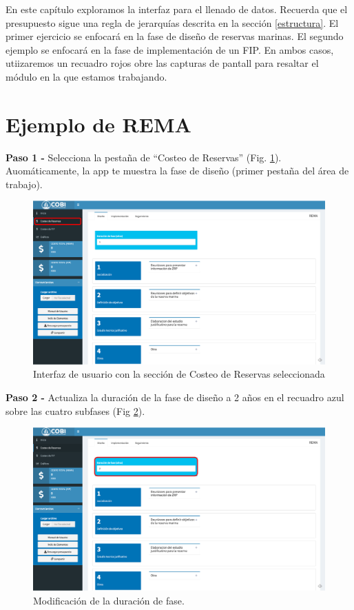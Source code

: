 \documentclass[
]{book}
\begin{document}
En este capítulo exploramos la interfaz para el llenado de datos. Recuerda que el presupuesto sigue una regla de jerarquías descrita en la sección \ref{estructura}. El primer ejercicio se enfocará en la fase de diseño de reservas marinas. El segundo ejemplo se enfocará en la fase de implementación de un FIP. En ambos casos, utiizaremos un recuadro rojos obre las capturas de pantall para resaltar el módulo en la que estamos trabajando.

\hypertarget{rema}{%
\section{Ejemplo de REMA}\label{rema}}

\textbf{Paso 1 - } Selecciona la pestaña de ``Costeo de Reservas'' (Fig. \ref{fig:rem-dis-1}). Auomáticamente, la app te muestra la fase de diseño (primer pestaña del área de trabajo).

\begin{figure}
\includegraphics[width=61.11in]{images/rema_dis_1} \caption{Interfaz de usuario con la sección de Costeo de Reservas seleccionada}\label{fig:rem-dis-1}
\end{figure}

\textbf{Paso 2 - } Actualiza la duración de la fase de diseño a 2 años en el recuadro azul sobre las cuatro subfases (Fig \ref{fig:rem-dis-2}).

\begin{figure}
\includegraphics[width=61.11in]{images/rema_dis_2} \caption{Modificación de la duración de fase.}\label{fig:rem-dis-2}
\end{figure}
\end{document}
